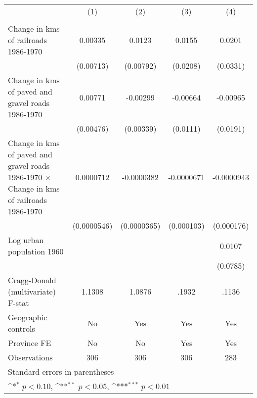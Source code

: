{
\def\sym#1{\ifmmode^{#1}\else\(^{#1}\)\fi}
\begin{tabular}{l*{4}{c}}
\hline\hline
                &\multicolumn{1}{c}{(1)}&\multicolumn{1}{c}{(2)}&\multicolumn{1}{c}{(3)}&\multicolumn{1}{c}{(4)}\\
                &\multicolumn{1}{c}{}&\multicolumn{1}{c}{}&\multicolumn{1}{c}{}&\multicolumn{1}{c}{}\\
\hline
Change in kms of railroads 1986-1970&  0.00335         &   0.0123         &   0.0155         &   0.0201         \\
                &(0.00713)         &(0.00792)         & (0.0208)         & (0.0331)         \\
[1em]
Change in kms of paved and gravel roads 1986-1970&  0.00771         & -0.00299         & -0.00664         & -0.00965         \\
                &(0.00476)         &(0.00339)         & (0.0111)         & (0.0191)         \\
[1em]
Change in kms of paved and gravel roads 1986-1970 $\times$ Change in kms of railroads 1986-1970&0.0000712         &-0.0000382         &-0.0000671         &-0.0000943         \\
                &(0.0000546)         &(0.0000365)         &(0.000103)         &(0.000176)         \\
[1em]
Log urban population 1960&                  &                  &                  &   0.0107         \\
                &                  &                  &                  & (0.0785)         \\
\hline
Cragg-Donald (multivariate) F-stat&   1.1308         &   1.0876         &    .1932         &    .1136         \\
Geographic controls&       No         &      Yes         &      Yes         &      Yes         \\
Province FE     &       No         &       No         &      Yes         &      Yes         \\
Observations    &      306         &      306         &      306         &      283         \\
\hline\hline
\multicolumn{5}{l}{\footnotesize Standard errors in parentheses}\\
\multicolumn{5}{l}{\footnotesize \sym{*} \(p<0.10\), \sym{**} \(p<0.05\), \sym{***} \(p<0.01\)}\\
\end{tabular}
}
